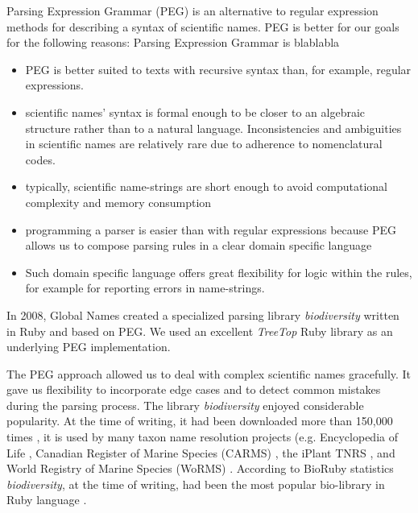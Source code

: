 \documentclass{bmcart}
\begin{document}
Parsing Expression Grammar (PEG) \cite{Ford2004} is an alternative to regular
expression methods for describing a syntax of scientific names. PEG is better
for our goals for the following reasons: Parsing Expression Grammar is
blablabla 

\begin{itemize}

  \item PEG is better suited to texts with recursive syntax than, for example,
    regular expressions.

  \item scientific names' syntax is formal enough to be closer to an algebraic
    structure rather than to a natural language. Inconsistencies and
    ambiguities in scientific names are relatively rare due to adherence to
    nomenclatural codes.

  \item typically, scientific name-strings are short enough to avoid
    computational complexity and memory consumption

  \item programming a parser is easier than with regular expressions because
    PEG allows us to compose parsing rules in a clear domain specific language

  \item Such domain specific language offers great flexibility for logic within
    the rules, for example for reporting errors in name-strings.

\end{itemize}

In 2008, Global Names created a specialized parsing library
\textit{biodiversity} \cite{biodiversity} written in Ruby and based on PEG. We
used an excellent \textit{TreeTop} Ruby library \cite{treetop} as an underlying
PEG implementation.

The PEG approach allowed us to deal with complex scientific names gracefully.
It gave us flexibility to incorporate edge cases and to detect common mistakes
during the parsing process. The library \textit{biodiversity} enjoyed
considerable popularity. At the time of writing, it had been downloaded more
than 150,000 times \cite{bdiv-downloads}, it is used by many taxon name
resolution projects (e.g. Encyclopedia of Life \cite{eol}, Canadian Register of
Marine Species (CARMS) \cite{carms}, the iPlant TNRS \cite{iplant}, and World
Registry of Marine Species (WoRMS) \cite{worms}.  According to BioRuby
statistics \textit{biodiversity}, at the time of writing, had been the most
popular bio-library in Ruby language \cite{biogems}.
\end{document}
